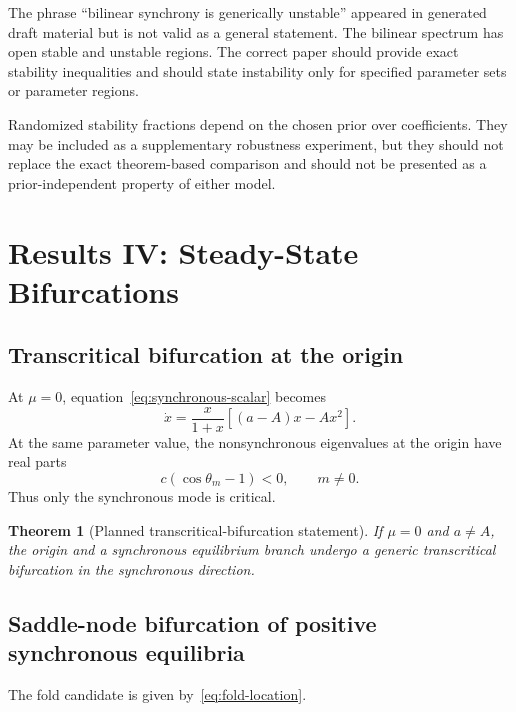 \documentclass[11pt, reqno]{amsart}
\newtheorem{theorem}{Theorem}[section]
\theoremstyle{definition}
\theoremstyle{remark}
\begin{document}
The phrase ``bilinear synchrony is generically unstable'' appeared in generated
draft material but is not valid as a general statement.  The bilinear spectrum
has open stable and unstable regions.  The correct paper should provide exact
stability inequalities and should state instability only for specified
parameter sets or parameter regions.

Randomized stability fractions depend on the chosen prior over coefficients.
They may be included as a supplementary robustness experiment, but they should
not replace the exact theorem-based comparison and should not be presented as a
prior-independent property of either model.

\section{Results IV: Steady-State Bifurcations}
\label{sec:steady-bifurcations}

\subsection{Transcritical bifurcation at the origin}

At $\mu=0$, equation~\eqref{eq:synchronous-scalar} becomes
\[
    \dot x
    =
    \frac{x}{1+x}
    \left[(a-A)x-Ax^2\right].
\]
At the same parameter value, the nonsynchronous eigenvalues at the origin have
real parts
\[
    c(\cos\theta_m-1)<0,
    \qquad m\ne0.
\]
Thus only the synchronous mode is critical.

\begin{theorem}[Planned transcritical-bifurcation statement]
If $\mu=0$ and $a\ne A$, the origin and a synchronous equilibrium branch
undergo a generic transcritical bifurcation in the synchronous direction.
\end{theorem}


\subsection{Saddle-node bifurcation of positive synchronous equilibria}

The fold candidate is given by~\eqref{eq:fold-location}.
\end{document}
